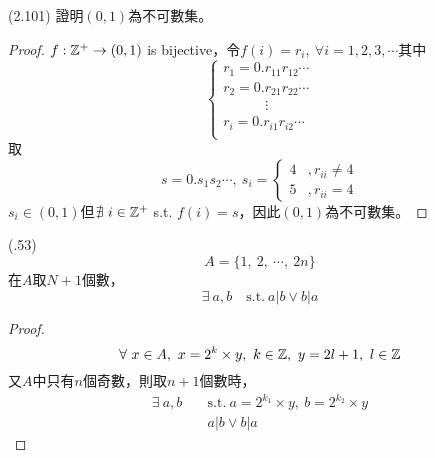 \item \begin{theorem}{(2.101)} 證明$(0, 1)$為不可數集。 \\
    \begin{proof}
        $f: \mathbb{Z}^+ \rightarrow (0, 1)$ is bijective，令$f(i) = r_i, \ \forall i = 1, 2, 3, \cdots$其中 \\ \begin{equation}
            \begin{cases}
                r_1 = 0.r_{11}r_{12}\cdots \\
                r_2 = 0.r_{21}r_{22}\cdots \\
                \quad \quad \quad \vdots \\
                r_i = 0.r_{i1}r_{i2}\cdots \\
            \end{cases}
        \end{equation} 取 \begin{equation}
            s = 0.s_1s_2\cdots, \ s_i = \begin{cases}
                4 &, r_{ii} \neq 4 \\
                5 &, r_{ii} = 4
            \end{cases}
        \end{equation} $s_i \in (0, 1)$但$\nexists \ i \in \mathbb{Z}^+$ s.t. $f(i) = s$，因此$(0, 1)$為不可數集。
    \end{proof}
\end{theorem}

\item \begin{theorem}{(.53)} \begin{equation}
        A = \{1, \ 2, \ \cdots, \ 2n\}
    \end{equation} 在$A$取$N + 1$個數，\begin{equation}
        \exists \ a, b \quad \text{s.t.} \ a | b \lor b | a
    \end{equation}
    \begin{proof}
        \begin{equation}
            \forall \ x \in A, \ x = 2^k \times y, \ k \in \mathbb{Z}, \ y = 2l + 1, \ l \in \mathbb{Z}
        \end{equation} 又$A$中只有$n$個奇數，則取$n + 1$個數時， \begin{equation}
            \begin{aligned}
                \exists \ a, b \quad & \text{s.t.} \ a = 2^{k_1} \times y, \ b = 2^{k_2} \times y \\
                & a | b \lor b | a
            \end{aligned}
        \end{equation}
    \end{proof}
\end{theorem}
